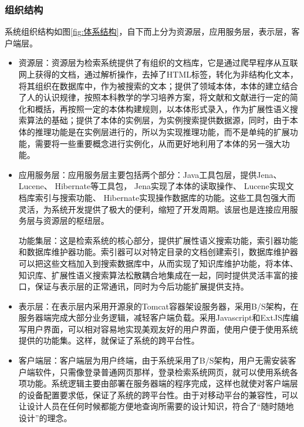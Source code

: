 \documentclass[12pt,a4paper]{article}
\begin{document}
		\subsubsection{组织结构}
	系统组织结构如图\ref{fig:体系结构}，自下而上分为资源层，应用服务层，表示层，客户端层。
\begin{itemize}
	 	\item
	资源层：资源层为检索系统提供了有组织的文档库，它是通过爬早程序从互联网上获得的文档，通过解析操作，去掉了{\Times HTML}标签，转化为非结构化文本，将其组织在数据库中，作为被搜索的文本；提供了领域本体，本体的建立结合了人的认识规律，按照本科教学的学习培养方案，将文献\cite{2005shen}和文献\cite{2008liu}进行一定的简化和概括，再按照一定的本体构建规则，以本体形式录入，作为扩展性语义搜索算法的基础；提供了本体的实例层，为实例搜索提供数据源，同时，由于本体的推理功能是在实例层进行的，所以为实现推理功能，而不是单纯的扩展功能，需要将一些重要概念进行实例化，从而更好地利用了本体的另一强大功能。
		\item
	应用服务层：应用服务层主要包括两个部分：{\Times Java}工具包层，提供{\Times Jena}、 {\Times Lucene}、 {\Times Hibernate}等工具包， {\Times Jena}实现了本体的读取操作、 {\Times Lucene}实现文档库索引与搜索功能、 {\Times Hibernate}实现操作数据库的功能。这些工具包强大而灵活，为系统开发提供了极大的便利，缩短了开发周期。该层也是连接应用服务层与资源层的枢纽层。
	
	功能集层：这是检索系统的核心部分，提供扩展性语义搜索功能，索引器功能和数据库维护器功能。索引器可以对特定目录的文档创建索引，数据库维护器可以把这些文档加入到搜索数据库中，从而实现了知识库维护功能，将本体、知识库、扩展性语义搜索算法松散耦合地集成在一起，同时提供灵活丰富的接口，保证与表示层的正常通讯，同时为今后功能扩展提供支持。
		\item
	表示层：在表示层内采用开源泉的{\Times Tomcat}容器架设服务器，采用{\Times B/S}架构，在服务器端完成大部分业务逻辑，减轻客户端负载。采用{\Times Javascript}和{\Times ExtJS}库编写用户界面，可以相对容易地实现美观友好的用户界面，使用户便于使用系统提供的功能集。这样，就保证了系统的跨平台性。
		\item
	客户端层：客户端层为用户终端，由于系统采用了{\Times B/S}架构，用户无需安装客户端软件，只需像登录普通网页那样，登录检索系统网页，就可以使用系统各项功能。系统逻辑主要由部署在服务器端的程序完成，这样也就使对客户端层的设备配置要求低，保证了系统的跨平台性。由于对移动平台的兼容性，可以让设计人员在任何时候都能方便地查询所需要的设计知识，符合了“随时随地设计”的理念。
	
	\end{itemize}
	
\end{document}
